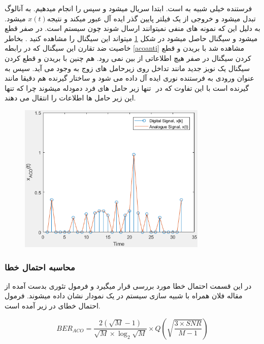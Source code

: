\documentclass{article}
\begin{document}
فرستنده  خیلی شبیه به  است. ابتدا  سریال میشود و سپس   را انجام میدهیم.    به آنالوگ تبدل میشود و خروجی از یک فیلتر پایین گذر ایده آل عبور میکند و نتیجه$ x(t)‌$ میشود. به دلیل این که نمونه های منفی نمیتوانند ارسال شوند چون سیستم  است. در صفر قطع میشود و سیگنال  حاصل میشود در شکل \ref{acoclipped} میتواند این سیگنال را مشاهده کنید . بخاطر خاصیت ضد تقارن این سیگنال که در رابطه \ref{acoanti}  مشاهده شد با بریدن و قطع کردن سیگنال در صفر هیچ اطلاعاتی از بین نمی رود. هم چنین با بریدن و قطع کردن سیگنال یک نویز جدید مانند تداخل روی زیرحامل های زوج به وجود می آید.\cite{4} سپس   به عنوان ورودی به فرستنده نوری ایده آل داده می شود و ساختار گیرنده هم دقیقا مانند گیرنده   است با این تفاوت که در  ‌ تنها زیر حامل های فرد دمودله میشوند چرا که تنها این زیر حامل ها اطلاعات را انتقال می دهند.

\begin{figure}[H]
\begin{center}
\includegraphics[width=9cm]{xacoclipped.PNG}
\end{center}
\caption{   }
\label{acoclipped}
\end{figure}

\subsubsection{محاسبه احتمال خطا}
در این قسمت احتمال خطا  مورد بررسی قرار میگیرد و فرمول تئوری بدست آمده از مقاله فلان همراه با شبیه سازی سیستم در یک نمودار نشان داده میشوند. فرمول احتمال خطای  در زیر آمده است.

\begin{equation}
BER_{ACO} = \frac{2(\sqrt{M}-1)}{\sqrt{M}\times \log_{2}\sqrt{M}} \times Q(\sqrt{\frac{3\times SNR}{M - 1}})
\label{acober}
\end{equation}
\end{document}
